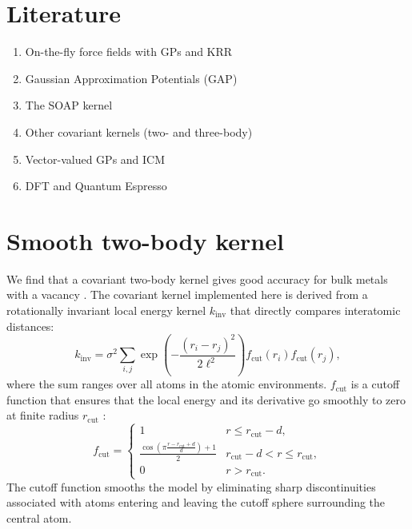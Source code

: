 \documentclass[%
superscriptaddress,
preprint,
amsmath,amssymb,
aps,
]{revtex4-1}
\begin{document}
\maketitle

\section{Literature}
\begin{enumerate}

\item On-the-fly force fields with GPs and KRR \cite{li2015molecular, botu2015adaptive, botu2015learning}

\item Gaussian Approximation Potentials (GAP)
\cite{bartok2010gaussian, bartok2015gaussian, deringer2017machine}

\item The SOAP kernel \cite{bartok2013representing}

\item Other covariant kernels (two- and three-body) \cite{deringer2017machine, bartok2015gaussian, glielmo2017accurate, glielmo2018efficient}

\item Vector-valued GPs and ICM \cite{alvarez2012kernels}

\item DFT and Quantum Espresso \cite{kohn1999nobel, giannozzi2009quantum}

\end{enumerate}

\section{Smooth two-body kernel}
We find that a covariant two-body kernel gives good accuracy for bulk metals with a vacancy \cite{glielmo2018efficient, deringer2017machine}. The covariant kernel implemented here is derived from a rotationally invariant local energy kernel $k_{\text{inv}}$ that directly compares interatomic distances:
\begin{equation}
k_{\text{inv}} = \sigma^2 \sum_{i ,j} \exp\left( - \frac{(r_i - r_j)^2}{2 \ell^2} \right) f_{\text{cut}}(r_i) f_{\text{cut}}(r_j),
\label{loc_kern}
\end{equation}
where the sum ranges over all atoms in the atomic environments. $f_{\text{cut}}$ is a cutoff function that ensures that the local energy and its derivative go smoothly to zero at finite radius $r_{\text{cut}}$ \cite{bartok2015gaussian}:
\begin{equation}
f_{\text{cut}} =  \begin{cases} 
    1 & r\leq r_{\text{cut}}-d, \\
    \frac{\cos(\pi \frac{r-r_{\text{cut}}+d}{d}) + 1}{2} & r_{\text{cut}} - d < r \le r_{\text{cut}}, \\
    0 & r > r_{\text{cut}}.
 \end{cases}
\end{equation}
The cutoff function smooths the model by eliminating sharp discontinuities associated with atoms entering and leaving the cutoff sphere surrounding the central atom.
\end{document}
